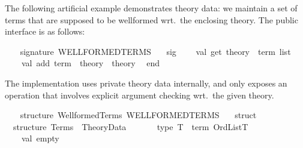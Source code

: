 \begin{isabellebody}
\begin{isamarkuptext}
\begin{description}
  \end{description}%
\end{isamarkuptext}%
\isamarkuptrue%
%
\endisatagmlref
{\isafoldmlref}%
%
\isadelimmlref
%
\endisadelimmlref
%
\isadelimmlex
%
\endisadelimmlex
%
\isatagmlex
%
\begin{isamarkuptext}%
The following artificial example demonstrates theory
  data: we maintain a set of terms that are supposed to be wellformed
  wrt.\ the enclosing theory.  The public interface is as follows:%
\end{isamarkuptext}%
\isamarkuptrue%
%
\endisatagmlex
{\isafoldmlex}%
%
\isadelimmlex
%
\endisadelimmlex
%
\isadelimML
%
\endisadelimML
%
\isatagML
{}\isamarkupfalse%
\ {}\isanewline
\ \ signature\ WELLFORMED{}TERMS\ {}\isanewline
\ \ sig\isanewline
\ \ \ \ val\ get{}\ theory\ {}{}\ term\ list\isanewline
\ \ \ \ val\ add{}\ term\ {}{}\ theory\ {}{}\ theory\isanewline
\ \ end{}\isanewline
{}%
\endisatagML
{\isafoldML}%
%
\isadelimML
%
\endisadelimML
%
\begin{isamarkuptext}%
The implementation uses private theory data internally, and
  only exposes an operation that involves explicit argument checking
  wrt.\ the given theory.%
\end{isamarkuptext}%
\isamarkuptrue%
%
\isadelimML
%
\endisadelimML
%
\isatagML
{}\isamarkupfalse%
\ {}\isanewline
\ \ structure\ Wellformed{}Terms{}\ WELLFORMED{}TERMS\ {}\isanewline
\ \ struct\isanewline
\isanewline
\ \ structure\ Terms\ {}\ Theory{}Data\isanewline
\ \ {}\isanewline
\ \ \ \ type\ T\ {}\ term\ Ord{}List{}T{}\isanewline
\ \ \ \ val\ empty\ {}\ {}{}{}\isanewline

\end{isabellebody}
